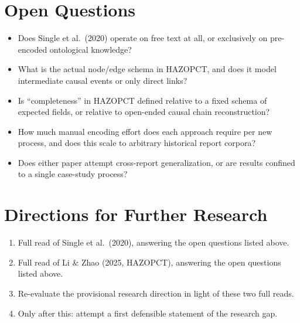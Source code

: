 \section{Open Questions}
\begin{itemize}
  \item Does Single et al.\ (2020) operate on free text at all, or exclusively on pre-encoded ontological knowledge?
  \item What is the actual node/edge schema in HAZOPCT, and does it model intermediate causal events or only direct links?
  \item Is ``completeness'' in HAZOPCT defined relative to a fixed schema of expected fields, or relative to open-ended causal chain reconstruction?
  \item How much manual encoding effort does each approach require per new process, and does this scale to arbitrary historical report corpora?
  \item Does either paper attempt cross-report generalization, or are results confined to a single case-study process?
\end{itemize}

\section{Directions for Further Research}
\begin{enumerate}
  \item Full read of Single et al.\ (2020), answering the open questions listed above.
  \item Full read of Li \& Zhao (2025, HAZOPCT), answering the open questions listed above.
  \item Re-evaluate the provisional research direction in light of these two full reads.
  \item Only after this: attempt a first defensible statement of the research gap.
\end{enumerate}

